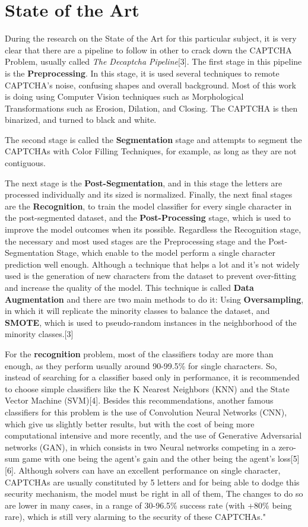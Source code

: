 \documentclass[conference]{IEEEtran}
\begin{document}
\section{State of the Art} 
During the research on the State of the Art for this particular subject, it is very clear that there are a pipeline to follow in other to crack down the CAPTCHA Problem, usually called \textit{The Decaptcha Pipeline}[3]. 
\param The first stage in this pipeline is the \textbf{Preprocessing}. In this stage, it is used several techniques to remote CAPTCHA's noise, confusing shapes and overall background. Most of this work is doing using Computer Vision techniques such as Morphological Transformations such as Erosion, Dilation, and Closing. The CAPTCHA is then binarized, and turned to black and white. \par The second stage is called the \textbf{Segmentation} stage and attempts to segment the CAPTCHAs with Color Filling Techniques, for example, as long as they are not contiguous. \par The next stage is the \textbf{Post-Segmentation}, and in this stage the letters are processed individually and its sized is normalized. Finally, the next final stages are the \textbf{Recognition}, to train the model classifier for every single character in the post-segmented dataset, and the \textbf{Post-Processing} stage, which is used to improve the model outcomes when its possible. Regardless the Recognition stage, the necessary and most used stages are the Preprocessing stage and the Post-Segmentation Stage, which enable to the model perform a single character prediction well enough. Although a technique that helps a lot and it's not widely used is the generation of new characters from the dataset to prevent over-fitting and increase the quality of the model. This technique is called \textbf{Data Augmentation} and there are two main methods to do it: Using \textbf{Oversampling}, in which it will replicate the minority classes to balance the dataset, and \textbf{SMOTE}, which is used to pseudo-random instances in the neighborhood of the minority classes.[3]
\par For the \textbf{recognition} problem, most of the classifiers today are more than enough, as they perform usually around 90-99.5\% for single characters. So, instead of searching for a classifier based only in performance, it is recommended to choose simple classifiers like the K Nearest Neighbors (KNN) and the State Vector Machine (SVM)[4]. Besides this recommendations, another famous classifiers for this problem is the use of Convolution Neural Networks (CNN), which give us slightly better results, but with the cost of being more computational intensive and more recently, and the use of Generative Adversarial networks (GAN), in which consists in two Neural networks competing in a zero-sum game with one being the agent's gain and the other being the agent's loss[5][6]. Although solvers can have an excellent performance on single character, CAPTCHAs are usually constituted by 5 letters and for being able to dodge this security mechanism, the model must be right in all of them, The changes to do so are lower in many cases, in a range of 30-96.5\% success rate (with +80\% being rare), which is still very alarming to the security of these CAPTCHAs."
\end{document}

